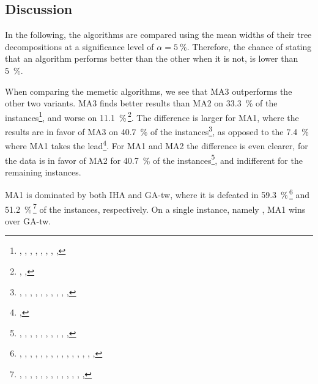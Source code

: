 \documentclass[thesis.tex]{subfiles}
\begin{document}
\clearpage
\subsection{Discussion}
In the following, the algorithms are compared using the mean widths of their tree decompositions at a significance level of $\alpha = \SI{5}{\percent}$. Therefore, the chance of stating that an algorithm performs better than the other when it is not, is lower than \SI{5}{\percent}.

When comparing the memetic algorithms, we see that \gls{MA3} outperforms the other two variants. \gls{MA3} finds better results than \gls{MA2} on \SI{33.3}{\percent} of the instances\footnote{, , , , , , , , }, and worse on \SI{11.1}{\percent}\,\footnote{, , }. The difference is larger for \gls{MA1}, where the results are in favor of \gls{MA3} on \SI{40.7}{\percent} of the instances\footnote{, , , , , , , , , , }, as opposed to the \SI{7.4}{\percent} where \gls{MA1} takes the lead\footnote{, }. For \gls{MA1} and \gls{MA2} the difference is even clearer, for the data is in favor of \gls{MA2} for \SI{40.7}{\percent} of the instances\footnote{, , , , , , , , , , }, and indifferent for the remaining instances.

\gls{MA1} is dominated by both \gls{IHA} and \gls{GA-tw}, where it is defeated in \SI{59.3}{\percent}\,\footnote{, , , , , , , , , , , , , , , } and \SI{51.2}{\percent}\,\footnote{, , , , , , , , , , , , , } of the instances, respectively. On a single instance, namely , \gls{MA1} wins over \gls{GA-tw}.
\end{document}
